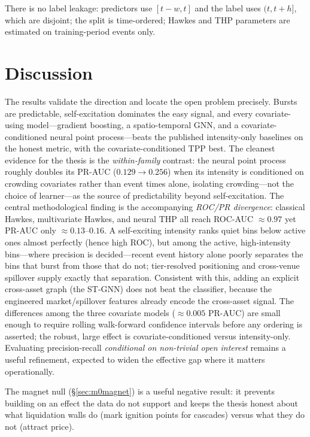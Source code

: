 \documentclass[11pt,a4paper]{article}
\begin{document}
There is no label leakage: predictors use $[t-w,t]$ and the label uses $(t,t+h]$, which are disjoint; the split is time-ordered; Hawkes and THP parameters are estimated on training-period events only.

\section{Discussion}

The results validate the direction and locate the open problem precisely. Bursts are predictable, self-excitation dominates the easy signal, and every covariate-using model---gradient boosting, a spatio-temporal GNN, and a covariate-conditioned neural point process---beats the published intensity-only baselines on the honest metric, with the covariate-conditioned TPP best. The cleanest evidence for the thesis is the \emph{within-family} contrast: the neural point process roughly doubles its PR-AUC ($0.129\to0.256$) when its intensity is conditioned on crowding covariates rather than event times alone, isolating crowding---not the choice of learner---as the source of predictability beyond self-excitation. The central methodological finding is the accompanying \emph{ROC/PR divergence}: classical Hawkes, multivariate Hawkes, and neural THP all reach ROC-AUC $\approx 0.97$ yet PR-AUC only $\approx 0.13$--$0.16$. A self-exciting intensity ranks quiet bins below active ones almost perfectly (hence high ROC), but among the active, high-intensity bins---where precision is decided---recent event history alone poorly separates the bins that burst from those that do not; tier-resolved positioning and cross-venue spillover supply exactly that separation. Consistent with this, adding an explicit cross-asset graph (the ST-GNN) does not beat the classifier, because the engineered market/spillover features already encode the cross-asset signal. The differences among the three covariate models ($\approx 0.005$ PR-AUC) are small enough to require rolling walk-forward confidence intervals before any ordering is asserted; the robust, large effect is covariate-conditioned versus intensity-only. Evaluating precision-recall \emph{conditional on non-trivial open interest} remains a useful refinement, expected to widen the effective gap where it matters operationally.

The magnet null (\S\ref{sec:m0magnet}) is a useful negative result: it prevents building on an effect the data do not support and keeps the thesis honest about what liquidation walls do (mark ignition points for cascades) versus what they do not (attract price).
\end{document}
